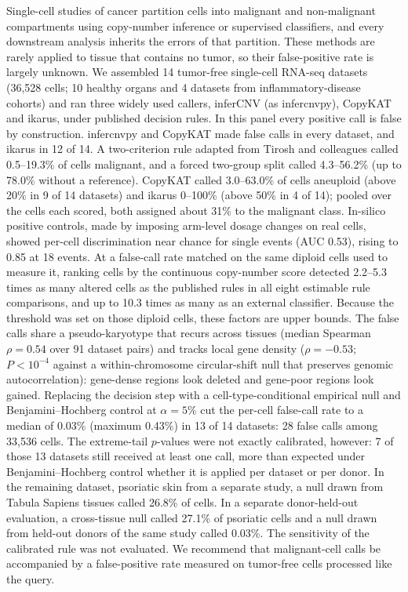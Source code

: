 \documentclass[11pt,letterpaper]{article}
\begin{document}
\noindent Single-cell studies of cancer partition cells into malignant and non-malignant compartments using copy-number inference or supervised classifiers, and every downstream analysis inherits the errors of that partition. These methods are rarely applied to tissue that contains no tumor, so their false-positive rate is largely unknown. We assembled 14 tumor-free single-cell RNA-seq datasets (36{,}528 cells; 10 healthy organs and 4 datasets from inflammatory-disease cohorts) and ran three widely used callers, inferCNV (as infercnvpy), CopyKAT and ikarus, under published decision rules. In this panel every positive call is false by construction. infercnvpy and CopyKAT made false calls in every dataset, and ikarus in 12 of 14. A two-criterion rule adapted from Tirosh and colleagues called 0.5--19.3\% of cells malignant, and a forced two-group split called 4.3--56.2\% (up to 78.0\% without a reference). CopyKAT called 3.0--63.0\% of cells aneuploid (above 20\% in 9 of 14 datasets) and ikarus 0--100\% (above 50\% in 4 of 14); pooled over the cells each scored, both assigned about 31\% to the malignant class. In-silico positive controls, made by imposing arm-level dosage changes on real cells, showed per-cell discrimination near chance for single events (AUC 0.53), rising to 0.85 at 18 events. At a false-call rate matched on the same diploid cells used to measure it, ranking cells by the continuous copy-number score detected 2.2--5.3 times as many altered cells as the published rules in all eight estimable rule comparisons, and up to 10.3 times as many as an external classifier. Because the threshold was set on those diploid cells, these factors are upper bounds. The false calls share a pseudo-karyotype that recurs across tissues (median Spearman $\rho = 0.54$ over 91 dataset pairs) and tracks local gene density ($\rho = -0.53$; $P < 10^{-4}$ against a within-chromosome circular-shift null that preserves genomic autocorrelation): gene-dense regions look deleted and gene-poor regions look gained. Replacing the decision step with a cell-type-conditional empirical null and Benjamini--Hochberg control at $\alpha = 5\%$ cut the per-cell false-call rate to a median of 0.03\% (maximum 0.43\%) in 13 of 14 datasets: 28 false calls among 33{,}536 cells. The extreme-tail $p$-values were not exactly calibrated, however: 7 of those 13 datasets still received at least one call, more than expected under Benjamini--Hochberg control whether it is applied per dataset or per donor. In the remaining dataset, psoriatic skin from a separate study, a null drawn from Tabula Sapiens tissues called 26.8\% of cells. In a separate donor-held-out evaluation, a cross-tissue null called 27.1\% of psoriatic cells and a null drawn from held-out donors of the same study called 0.03\%. The sensitivity of the calibrated rule was not evaluated. We recommend that malignant-cell calls be accompanied by a false-positive rate measured on tumor-free cells processed like the query.
\end{document}
